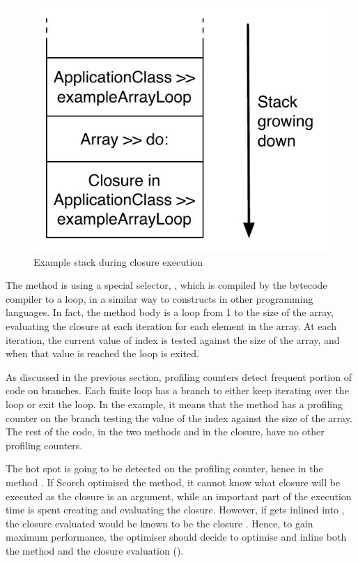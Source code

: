 \documentclass[a4paper,12pt,twoside]{../includes/ThesisStyle}
\begin{document}
\begin{figure}[h!]
    \begin{center}
        \includegraphics[width=0.42\linewidth]{ExampleLoopStack}
        \caption{Example stack during closure execution}
        \label{fig:ExampleLoopStack}
    \end{center}
\end{figure}

The method  is using a special selector, , which is compiled by the bytecode compiler to a loop, in a similar way to  constructs in other programming languages. In fact, the  method body is a loop from 1 to the size of the array, evaluating the closure at each iteration for each element in the array. At each iteration, the current value of index is tested against the size of the array, and when that value is reached the loop is exited.

As discussed in the previous section, profiling counters detect frequent portion of code on branches. Each finite loop has a branch to either keep iterating over the loop or exit the loop. In the example, it means that the method  has a profiling counter on the branch testing the value of the index against the size of the array. The rest of the code, in the two methods and in the closure, have no other profiling counters.

The hot spot is going to be detected on the profiling counter, hence in the method . If Scorch optimised the  method, it cannot know what closure will be executed as the closure is an argument, while an important part of the execution time is spent creating and evaluating the closure. However, if  gets inlined into , the closure evaluated would be known to be the closure . Hence, to gain maximum performance, the optimiser should decide to optimise  and inline both the  method and the closure evaluation (). 
\end{document}

